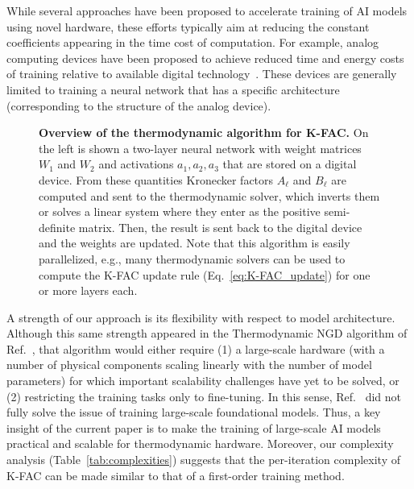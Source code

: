 While several approaches have been proposed to accelerate training of AI models using novel hardware, these efforts typically aim at reducing the constant coefficients appearing in the time cost of computation. For example, analog computing devices have been proposed to achieve reduced
time and energy costs of training relative to available digital technology~\cite{kim2017analog,ambrogio2018equivalent,cristiano2018perspective,aguirre2024hardware}. These devices are generally limited to training a neural network that has a specific architecture (corresponding to the
structure of the analog device). 

\begin{figure*}[t]%
\centering
\scalebox{1}{}
\caption{\justifying \textbf{Overview of the thermodynamic algorithm for K-FAC.} On the left is shown a two-layer neural network with weight matrices $W_1$ and $W_2$ and activations $a_1, a_2, a_3$ that are stored on a digital device. From these quantities Kronecker factors $A_\ell$ and $B_\ell$ are computed and sent to the thermodynamic solver, which inverts them or solves a linear system where they enter as the positive semi-definite matrix. Then, the result is sent back to the digital device and the weights are updated. Note that this algorithm is easily parallelized, e.g., many thermodynamic solvers can be used to compute the K-FAC update rule (Eq.~\eqref{eq:K-FAC_update}) for one or more layers each. 
}\label{fig:scheme}
\end{figure*}


A strength of our approach is its flexibility with respect to model architecture. Although this same strength appeared in the Thermodynamic NGD algorithm of Ref.~\cite{donatella2024thermodynamic}, that algorithm would either require (1) a large-scale hardware (with a number of physical components scaling linearly with the number of model parameters) for which important scalability challenges have yet to be solved, or (2) restricting the training tasks only to fine-tuning. In this sense, Ref.~\cite{donatella2024thermodynamic} did not fully solve the issue of training large-scale foundational models. Thus, a key insight of the current paper is to make the training of large-scale AI models practical and scalable for thermodynamic hardware. Moreover, our complexity analysis (Table~\ref{tab:complexities}) suggests that the per-iteration complexity of K-FAC can be made similar to that of a first-order training method.